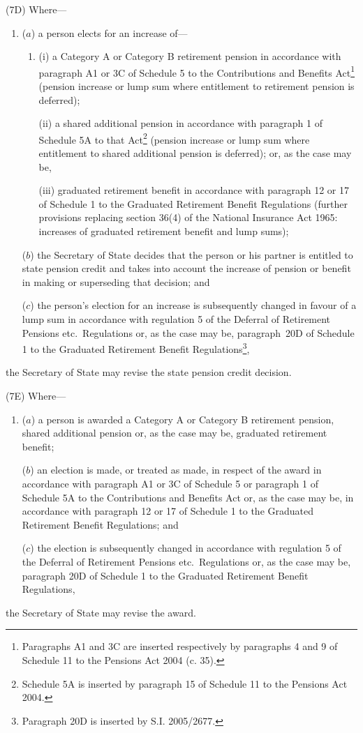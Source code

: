 \documentclass[12pt,a4paper]{article}
\begin{document}
(7D) Where—
\begin{enumerate}\item[]
($a$) a person elects for an increase of—
\begin{enumerate}\item[]
(i) a Category A or Category B retirement pension in accordance with paragraph A1 or 3C of Schedule 5 to the Contributions and Benefits Act\footnote{Paragraphs A1 and 3C are inserted respectively by paragraphs 4 and 9 of Schedule 11 to the Pensions Act 2004 (c. 35).} (pension increase or lump sum where entitlement to retirement pension is deferred);

(ii) a shared additional pension in accordance with paragraph 1 of Schedule 5A to that Act\footnote{Schedule 5A is inserted by paragraph 15 of Schedule 11 to the Pensions Act 2004.} (pension increase or lump sum where entitlement to shared additional pension is deferred); or, as the case may be,

(iii) graduated retirement benefit in accordance with paragraph 12 or 17 of Schedule 1 to the Graduated Retirement Benefit Regulations (further provisions replacing section 36(4) of the National Insurance Act 1965: increases of graduated retirement benefit and lump sums);\end{enumerate}

($b$) the Secretary of State decides that the person or his partner is entitled to state pension credit and takes into account the increase of pension or benefit in making or superseding that decision; and

($c$) the person’s election for an increase is subsequently changed in favour of a lump sum in accordance with regulation 5 of the Deferral of Retirement Pensions etc.\ Regulations or, as the case may be, paragraph~20D of Schedule 1 to the Graduated Retirement Benefit Regulations\footnote{Paragraph 20D is inserted by S.I. 2005/2677.},
\end{enumerate}
the Secretary of State may revise the state pension credit decision.

(7E) Where—
\begin{enumerate}\item[]
($a$) a person is awarded a Category A or Category B retirement pension, shared additional pension or, as the case may be, graduated retirement benefit;

($b$) an election is made, or treated as made, in respect of the award in accordance with paragraph A1 or 3C of Schedule 5 or paragraph 1 of Schedule 5A to the Contributions and Benefits Act or, as the case may be, in accordance with paragraph 12 or 17 of Schedule 1 to the Graduated Retirement Benefit Regulations; and

($c$) the election is subsequently changed in accordance with regulation 5 of the Deferral of Retirement Pensions etc.\ Regulations or, as the case may be, paragraph 20D of Schedule 1 to the Graduated Retirement Benefit Regulations,
\end{enumerate}
the Secretary of State may revise the award.
\end{document}
